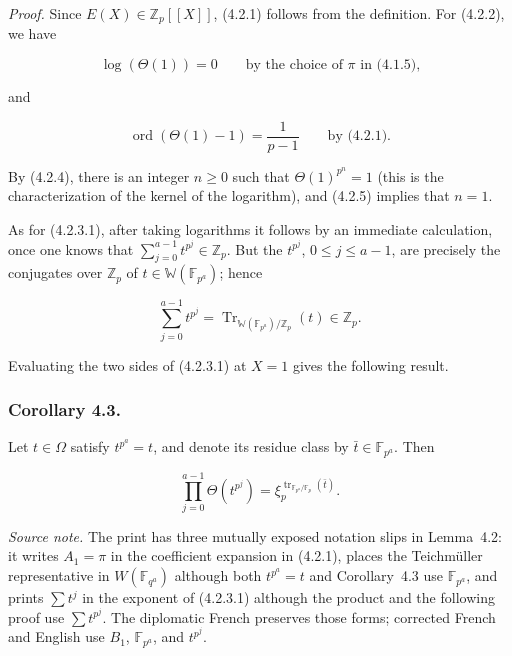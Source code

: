 \medskip
\noindent\emph{Proof.}
Since $E(X)\in\mathbb Z_p[[X]]$, (4.2.1) follows from the definition. For
(4.2.2), we have

\begin{equation}\tag{4.2.4}
\log(\Theta(1))=0
\qquad\text{by the choice of $\pi$ in (4.1.5),}
\end{equation}

and

\begin{equation}\tag{4.2.5}
\operatorname{ord}(\Theta(1)-1)=\frac1{p-1}
\qquad\text{by (4.2.1).}
\end{equation}

By (4.2.4), there is an integer $n\geq0$ such that
$\Theta(1)^{p^n}=1$ (this is the characterization of the kernel of the
logarithm), and (4.2.5) implies that $n=1$.

As for (4.2.3.1), after taking logarithms it follows by an immediate
calculation, once one knows that
$\sum_{j=0}^{a-1}t^{p^j}\in\mathbb Z_p$. But the $t^{p^j}$,
$0\leq j\leq a-1$, are precisely the conjugates over $\mathbb Z_p$ of
$t\in\mathbb W(\mathbb F_{p^a})$; hence

\[
\sum_{j=0}^{a-1}t^{p^j}
=\operatorname{Tr}_{\mathbb W(\mathbb F_{p^a})/\mathbb Z_p}(t)\in\mathbb Z_p.
\]

Evaluating the two sides of (4.2.3.1) at $X=1$ gives the following result.

\subsubsection*{Corollary 4.3.}
Let $t\in\Omega$ satisfy $t^{p^a}=t$, and denote its residue class by
$\bar t\in\mathbb F_{p^a}$. Then

\begin{equation}\tag{4.3.1}
\prod_{j=0}^{a-1}\Theta(t^{p^j})
=\xi_p^{\operatorname{tr}_{\mathbb F_{p^a}/\mathbb F_p}(\bar t)}.
\end{equation}

\medskip
\noindent\emph{Source note.}
The print has three mutually exposed notation slips in Lemma~4.2: it writes
$A_1=\pi$ in the coefficient expansion in (4.2.1), places the Teichmüller
representative in $W(\mathbb F_{q^a})$ although both $t^{p^a}=t$ and
Corollary~4.3 use $\mathbb F_{p^a}$, and prints $\sum t^j$ in the exponent
of (4.2.3.1) although the product and the following proof use
$\sum t^{p^j}$. The diplomatic French preserves those forms; corrected
French and English use $B_1$, $\mathbb F_{p^a}$, and $t^{p^j}$.

